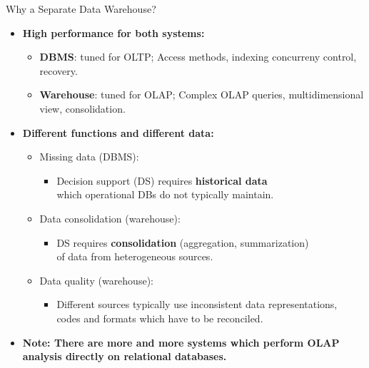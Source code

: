 \begin{frame}{Why a Separate Data Warehouse?}
	\begin{itemize}
		\item \textbf{High performance for both systems:}
		      \begin{itemize}
			      \item \textbf{\color{airforceblue}DBMS}: tuned for OLTP; Access methods, indexing concurreny control, recovery.
			      \item \textbf{\color{airforceblue}Warehouse}: tuned for OLAP; Complex OLAP queries, multidimensional view, consolidation.
		      \end{itemize}
		\item \textbf{Different functions and different data:}
		      \begin{itemize}
			      \item Missing data (DBMS):
			            \begin{itemize}
				            \item Decision support (DS) requires \textbf{\color{airforceblue}historical data} \\ which operational DBs do not typically maintain.
			            \end{itemize}
			      \item Data consolidation (warehouse):
			            \begin{itemize}
				            \item DS requires \textbf{\color{airforceblue}consolidation} (aggregation, summarization) \\
				                  of data from heterogeneous sources.
			            \end{itemize}
			      \item Data quality (warehouse):
			            \begin{itemize}
				            \item Different sources typically use inconsistent data representations, \\ codes and formats which have to be reconciled.
			            \end{itemize}
		      \end{itemize}
		\item \textbf{Note: There are more and more systems which perform OLAP\\ analysis directly on relational databases.}
	\end{itemize}
\end{frame}

